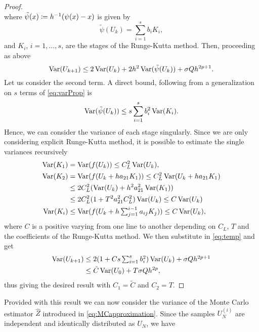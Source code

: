 \begin{proof}
\begin{equation}
\end{equation}
where $\tilde\psi(x) \coloneqq h^{-1}(\psi(x) - x)$ is given by
\begin{equation}
	\tilde\psi(U_k) = \sum_{i = 1}^{s} b_i K_i,
\end{equation} 
and $K_i$, $i = 1, \ldots, s$, are the stages of the Runge-Kutta method. Then, proceeding as above
\begin{equation}
	\operatorname{Var}(U_{k+1}) \leq 2\operatorname{Var}(U_k) + 2h^2 \operatorname{Var}(\tilde \psi (U_k)) + \sigma Q h^{2p + 1}.
\end{equation}
Let us consider the second term. A direct bound, following from a generalization on $s$ terms of \eqref{eq:varProp} is
\begin{equation}\label{eq:temp}
	\operatorname{Var}(\tilde \psi (U_k)) \leq s\sum_{i = 1}^{s} b_i^2 \operatorname{Var}(K_i).
\end{equation}
Hence, we can consider the variance of each stage singularly. Since we are only considering explicit Runge-Kutta method, it is possible to estimate the single variances recursively
\begin{equation}
\begin{aligned}
\operatorname{Var}(K_1) &= \operatorname{Var}(f(U_k)) \leq C_L^2 \operatorname{Var}(U_k), \\
\operatorname{Var}(K_2) &= \operatorname{Var}(f(U_k + ha_{21}K_1)) \leq C_L^2 \operatorname{Var}(U_k + ha_{21}K_1) \\
&\leq 2C_L^2 (\operatorname{Var}(U_k) + h^2a_{21}^2\operatorname{Var}(K_1)) \\
&\leq 2C_L^2 (1 + T^2a_{21}^2C_L^2)\operatorname{Var}(U_k) \leq C \operatorname{Var}(U_k) \\
\operatorname{Var}(K_i) &\leq \operatorname{Var}(f(U_k + h \textstyle\sum_{j=1}^{i-1}a_{ij}K_j)) \leq C \operatorname{Var}(U_k),
\end{aligned}
\end{equation}
where $C$ is a positive varying from one line to another depending on $C_L$, $T$ and the coefficients of the Runge-Kutta method. We then substitute in \eqref{eq:temp} and get
\begin{equation}
\begin{aligned}
\operatorname{Var}(U_{k+1}) &\leq 2 (1 + Cs\textstyle\sum_{i=1}^{s}b_i^2) \operatorname{Var}(U_k) + \sigma Q h^{2p + 1} \\
			  &\leq \tilde C \operatorname{Var}(U_0) + T \sigma Q h^{2p},
\end{aligned}
\end{equation}
thus giving the desired result with $C_1 = \tilde C$ and $C_2 = T$.
\end{proof}
\noindent Provided with this result we can now consider the variance of the Monte Carlo estimator $\hat Z$ introduced in \eqref{eq:MCapproximation}. Since the samples $U_N^{(i)}$ are independent and identically distributed as $U_N$, we have
